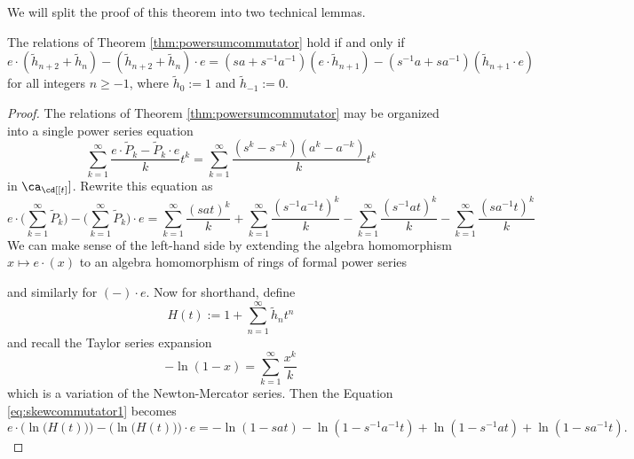 We will split the proof of this theorem into two technical lemmas.

\begin{lemma} \label{lem:powersumcommutator1}
The relations of Theorem \ref{thm:powersumcommutator} hold if and only if 
\begin{equation} \label{eq:skewcommutator1}
e \cdot (\tilde{h}_{n+2} + \tilde{h}_n) - (\tilde{h}_{n+2} + \tilde{h}_n) \cdot e = (sa + s^{-1}a^{-1}) (e \cdot \tilde{h}_{n+1}) - (s^{-1}a + sa^{-1}) (\tilde{h}_{n+1} \cdot e)
\end{equation}
for all integers $n \geq -1$, where $\tilde{h}_0 := 1$ and $\tilde{h}_{-1} := 0$.
\end{lemma}
\begin{proof}
The relations of Theorem \ref{thm:powersumcommutator} may be organized into a single power series equation
\begin{equation} \label{eq:skewcommutator1}
\sum_{k=1}^\infty \frac{e \cdot \widetilde{P}_k - \widetilde{P}_k \cdot e}{k} t^k = \sum_{k=1}^{\infty} \frac {(s^k - s^{-k}) (a^k - a^{-k})}{k} t^k
\end{equation}
in $\ca_\cd [[t]]$. Rewrite this equation as
\begin{equation} \label{eq:powersumcommutator2} 
e \cdot \Bigg( \sum_{k=1}^\infty \widetilde{P}_k \Bigg) - \Bigg( \sum_{k=1}^\infty \widetilde{P}_k \Bigg) \cdot e = \sum_{k=1}^{\infty} \frac {(sat)^k}{k} + \sum_{k=1}^{\infty} \frac {(s^{-1}a^{-1}t)^k}{k} - \sum_{k=1}^{\infty} \frac {(s^{-1}at)^k}{k} - \sum_{k=1}^{\infty} \frac {(sa^{-1}t)^k}{k}
\end{equation}
We can make sense of the left-hand side by extending the algebra homomorphism $x \mapsto e \cdot (x)$ to an algebra homomorphism of rings of formal power series
\begin{center}
\end{center}
and similarly for $(-) \cdot e$. Now for shorthand, define 
\[
H(t) := 1 + \sum_{n=1}^\infty \tilde{h}_n t^n
\]
and recall the Taylor series expansion
\[
-\ln(1-x) = \sum_{k=1}^\infty \frac{x^k}{k}
\]
which is a variation of the Newton-Mercator series. Then the Equation \eqref{eq:skewcommutator1} becomes
\begin{equation} \label{eq:powersumcommutator3} 
e \cdot \Big( \ln\big(H(t)\big) \Big) - \Big( \ln \big(H(t)\big) \Big) \cdot e = - \ln(1 - sat) - \ln(1 - s^{-1}a^{-1}t) + \ln(1 - s^{-1}at) + \ln(1 - sa^{-1}t).

\end{equation}
\end{proof}
